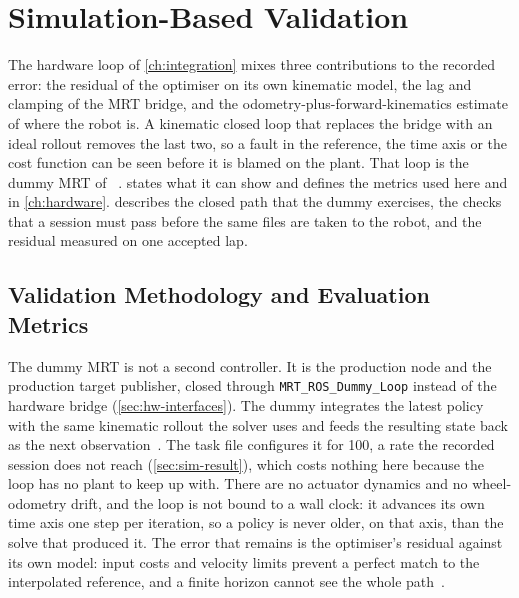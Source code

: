 \chapter{Simulation-Based Validation}
\label{ch:simulation}

The hardware loop of \cref{ch:integration} mixes three contributions to
the recorded \ee{} error: the residual of the optimiser on its own
kinematic model, the lag and clamping of the MRT bridge, and the
odometry-plus-forward-kinematics estimate of where the robot is. A
kinematic closed loop that replaces the bridge with an ideal rollout
removes the last two, so a fault in the reference, the time axis or the
cost function can be seen before it is blamed on the plant. That loop is
the dummy MRT of \ocs{}~\cite{ocs2Toolbox}. 
states what it can show and defines the metrics used here and in
\cref{ch:hardware}.  describes the closed \ee{} path
that the dummy exercises, the checks that a session must pass before the
same files are taken to the robot, and the residual measured on one
accepted lap.

\section{Validation Methodology and Evaluation Metrics}
\label{sec:sim-methodology}

The dummy MRT is not a second controller. It is the production \mpc{}
node and the production target publisher, closed through
\texttt{MRT\_ROS\_Dummy\_Loop} instead of the hardware bridge
(\cref{sec:hw-interfaces}). The dummy integrates the latest policy with
the same kinematic rollout the solver uses and feeds the resulting state
back as the next observation~\cite{ocs2Toolbox}. The task file
configures it for \qty{100}{\hz}, a rate the recorded session does not
reach (\cref{sec:sim-result}), which costs nothing here because the loop
has no plant to keep up with. There are no actuator dynamics and no
wheel-odometry drift, and the loop is not bound to a wall clock: it
advances its own time axis one step per iteration, so a policy is never
older, on that axis, than the solve that produced it. The \ee{} error
that remains is the optimiser's residual against its own model: input
costs and velocity limits prevent a perfect match to the interpolated
reference, and a finite horizon cannot see the whole
path~\cite{Rawlings2017MPC,Mayne2000Constrained}.

